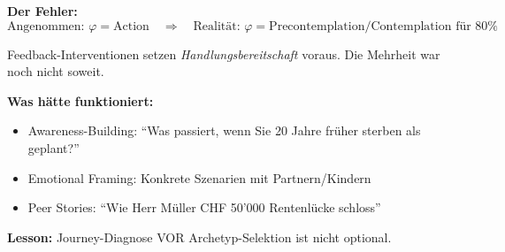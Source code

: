\begin{tcolorbox}[colback=red!3!white, colframe=red!60!black,
    title=\textbf{Case Study 1: Die Pensionskasse und die ``Action''-Illusion}]
\textbf{Der Fehler:}
\begin{equation*}
\text{Angenommen: } \varphi = \text{Action} \quad \Rightarrow \quad \text{Realität: } \varphi = \text{Precontemplation/Contemplation für 80\%}
\end{equation*}

Feedback-Interventionen setzen \textit{Handlungsbereitschaft} voraus. Die Mehrheit war noch nicht soweit.

\medskip
\textbf{Was hätte funktioniert:}
\begin{itemize}[nosep]
    \item Awareness-Building: ``Was passiert, wenn Sie 20 Jahre früher sterben als geplant?''
    \item Emotional Framing: Konkrete Szenarien mit Partnern/Kindern
    \item Peer Stories: ``Wie Herr Müller CHF 50'000 Rentenlücke schloss''
\end{itemize}

\textbf{Lesson:} \colorbox{yellow!30}{Journey-Diagnose VOR Archetyp-Selektion ist nicht optional.}

\end{tcolorbox}

